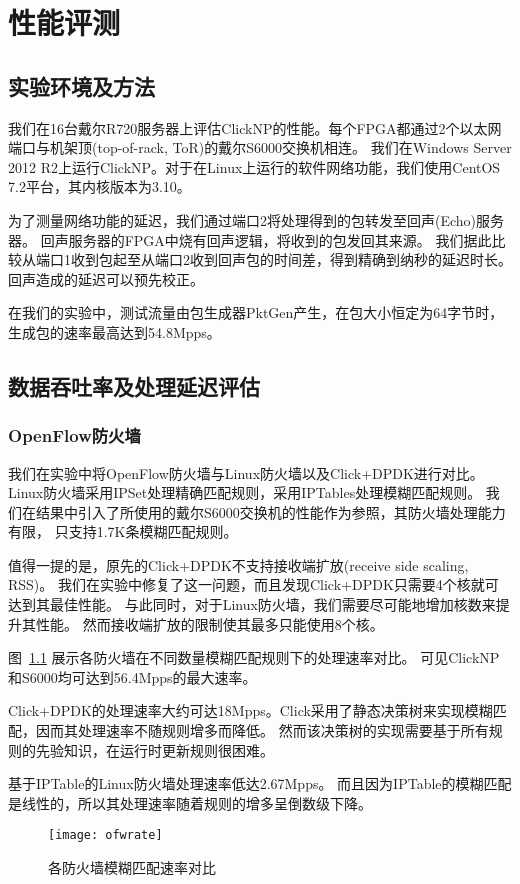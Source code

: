 \chapter{性能评测}
\section{实验环境及方法}
我们在16台戴尔R720服务器上评估ClickNP的性能。每个FPGA都通过2个以太网端口与机架顶(top-of-rack, ToR)的戴尔S6000交换机相连。
我们在Windows Server 2012 R2上运行ClickNP。对于在Linux上运行的软件网络功能，我们使用CentOS 7.2平台，其内核版本为3.10。

为了测量网络功能的延迟，我们通过端口2将处理得到的包转发至回声(Echo)服务器。
回声服务器的FPGA中烧有回声逻辑，将收到的包发回其来源。
我们据此比较从端口1收到包起至从端口2收到回声包的时间差，得到精确到纳秒的延迟时长。
回声造成的延迟可以预先校正。

在我们的实验中，测试流量由包生成器PktGen产生，在包大小恒定为64字节时，
生成包的速率最高达到54.8Mpps。

\section{数据吞吐率及处理延迟评估}
\subsection{OpenFlow防火墙}
我们在实验中将OpenFlow防火墙与Linux防火墙以及Click+DPDK进行对比。
Linux防火墙采用IPSet处理精确匹配规则，采用IPTables处理模糊匹配规则。
我们在结果中引入了所使用的戴尔S6000交换机的性能作为参照，其防火墙处理能力有限，
只支持1.7K条模糊匹配规则。

值得一提的是，原先的Click+DPDK不支持接收端扩放(receive side scaling, RSS)。
我们在实验中修复了这一问题，而且发现Click+DPDK只需要4个核就可达到其最佳性能。
与此同时，对于Linux防火墙，我们需要尽可能地增加核数来提升其性能。
然而接收端扩放的限制使其最多只能使用8个核。

图~\ref{fig:ofwrate} 展示各防火墙在不同数量模糊匹配规则下的处理速率对比。
可见ClickNP和S6000均可达到56.4Mpps的最大速率。

Click+DPDK的处理速率大约可达18Mpps。Click采用了静态决策树来实现模糊匹配，因而其处理速率不随规则增多而降低。
然而该决策树的实现需要基于所有规则的先验知识，在运行时更新规则很困难。

基于IPTable的Linux防火墙处理速率低达2.67Mpps。
而且因为IPTable的模糊匹配是线性的，所以其处理速率随着规则的增多呈倒数级下降。
\begin{figure}[ht]
\centering
\texttt{[image: ofwrate]}
\caption{各防火墙模糊匹配速率对比} \label{fig:ofwrate}
\end{figure}

